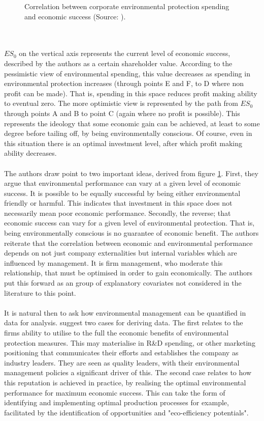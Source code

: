 {\begin{figure}[h]
\caption{Correlation between corporate environmental protection spending and economic success (Source: \cite{schaltegger2002link}).}
\label{ch3_successAndEnviornment}
\end{figure}\\\\
$ES_0$ on the vertical axis represents the current level of economic success, described by the authors as a certain shareholder value. According to the pessimistic view of environmental spending, this value decreases as spending in environmental protection increases (through points E and F, to D where non profit can be made). That is, spending in this space reduces profit making ability to eventual zero. The more optimistic view is represented by the path from $ES_0$ through points A and B to point C (again where no profit is possible). This represents the ideology that some economic gain can be achieved, at least to some degree before tailing off, by being environmentally conscious. Of course, even in this situation there is an optimal investment level, after which profit making ability decreases. \\\\
The authors draw point to two important ideas, derived from figure \ref{ch3_successAndEnviornment}. First, they argue that environmental performance can vary at a given level of economic success. It is possible to be equally successful by being either environmental friendly or harmful. This indicates that investment in this space does not necessarily mean poor economic performance. Secondly, the reverse; that economic success can vary for a given level of environmental protection. That is, being environmentally conscious is no guarantee of economic benefit. The authors reiterate that the correlation between economic and environmental performance depends on not just company externalities but internal variables which are influenced by management. It is firm management, who moderate this relationship, that must be optimised in order to gain economically. The authors put this forward as an group of explanatory covariates not considered in the literature to this point. \\\\
It is natural then to ask how environmental management can be quantified in data for analysis. \cite{schaltegger2002link} suggest two cases for deriving data. The first relates to the firms ability to utilise to the full the economic benefits of environmental protection measures. This may materialise in R\&D spending, or other marketing positioning that communicates their efforts and establishes the company as industry leaders. They are seen as quality leaders, with their environmental management policies a significant driver of this. The second case relates to how this reputation is achieved in practice, by realising the optimal environmental performance for maximum economic success. This can take the form of identifying and implementing optimal production processes for example, facilitated by the identification of opportunities and "eco-efficiency potentials". \\\\
}
